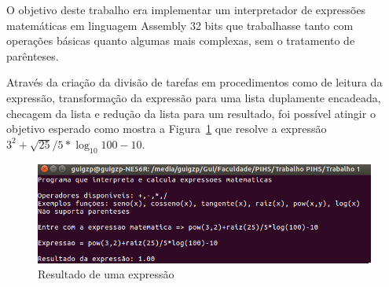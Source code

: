 \documentclass[12pt]{article}
\begin{document}
O objetivo deste trabalho era implementar um interpretador de expressões matemáticas em linguagem Assembly 32 bits que trabalhasse tanto com  operações básicas quanto algumas mais complexas, sem o tratamento de parênteses.

Através da criação da divisão de tarefas em procedimentos como de leitura da expressão, transformação da expressão para uma lista duplamente encadeada, checagem da lista e redução da lista para um resultado, foi possível atingir o objetivo esperado como mostra a Figura~\ref{fig:resultado} que resolve a expressão ${3^{2} + \sqrt{25}/{5} * {\log_{10} 100} -10 }$.

\begin{figure}[H]
\centering
\includegraphics[width=.5\textwidth]{Imagens/resultado.png}
\caption{Resultado de uma expressão}
\label{fig:resultado}
\end{figure}

\nocite{*}



\end{document}

